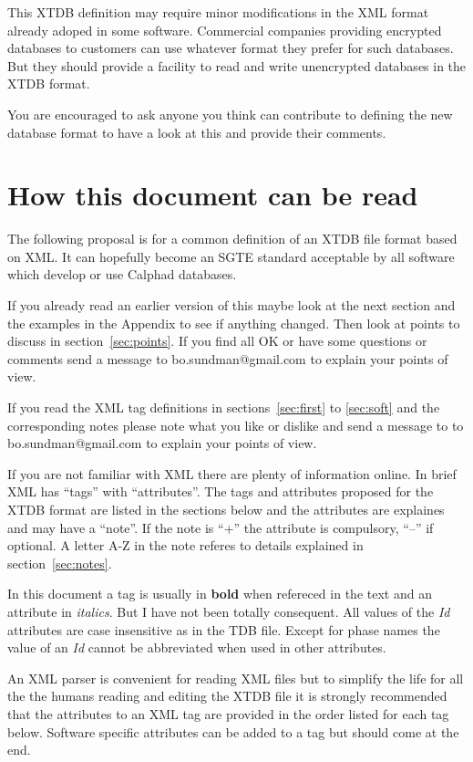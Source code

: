 \documentclass{article}
\begin{document}
This XTDB definition may require minor modifications in the XML format
already adoped in some software.  Commercial companies providing
encrypted databases to customers can use whatever format they prefer
for such databases.  But they should provide a facility to read and
write unencrypted databases in the XTDB format.

You are encouraged to ask anyone you think can contribute to defining
the new database format to have a look at this and provide their
comments.

\newpage

\section{How this document can be read}

The following proposal is for a common definition of an XTDB file
format based on XML.  It can hopefully become an SGTE standard
acceptable by all software which develop or use Calphad databases.

If you already read an earlier version of this maybe look at the next
section and the examples in the Appendix to see if anything changed.
Then look at points to discuss in section~\ref{sec:points}.  If you
find all OK or have some questions or comments send a message to
bo.sundman@gmail.com to explain your points of view.

If you read the XML tag definitions in sections~\ref{sec:first} to
\ref{sec:soft} and the corresponding notes please note what you like
or dislike and send a message to to bo.sundman@gmail.com to explain
your points of view.

If you are not familiar with XML there are plenty of information
online.  In brief XML has ``tags'' with ``attributes''.  The tags and
attributes proposed for the XTDB format are listed in the sections
below and the attributes are explaines and may have a ``note''.  If
the note is ``+'' the attribute is compulsory, ``--'' if optional.  A
letter A-Z in the note referes to details explained in
section~\ref{sec:notes}.

In this document a tag is usually in {\bf bold} when refereced in the
text and an attribute in {\em italics}.  But I have not been totally
consequent.  All values of the {\em Id} attributes are case
insensitive as in the TDB file.  Except for phase names the value of
an {\em Id} cannot be abbreviated when used in other attributes.

An XML parser is convenient for reading XML files but to simplify the
life for all the the humans reading and editing the XTDB file it is
strongly recommended that the attributes to an XML tag are provided in
the order listed for each tag below.  Software specific attributes can
be added to a tag but should come at the end.
\end{document}
